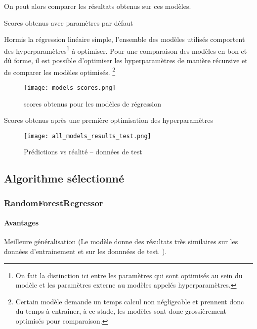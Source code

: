 On peut alors comparer les résultats obtenus sur ces modèles.
\begin{table}[H]
  
  \caption{Scores obtenus avec paramètres par défaut}
  \label{}
\end{table}

Hormis la régression linéaire simple, l'ensemble des modèles utilisés comportent
des hyperparamètres\footnote{On fait la distinction ici entre les paramètres
qui sont optimisés au sein du modèle et les paramètres externe au modèles appelés
hyperparamètres.} à optimiser.
Pour une comparaison des modèles en bon et dû forme, il est possible d'optimiser
les hyperparamètres de manière récursive et de comparer les modèles optimisés.
\footnote{Certain modèle demande un temps calcul non négligeable et prennent donc
du temps à entrainer, à ce stade, les modèles sont donc grossièrement optimisés
pour comparaison.}

\begin{figure}[H]
  \texttt{[image: models\_scores.png]}
  \caption{scores obtenus pour les modèles de régression}
  \label{}
\end{figure}

\begin{table}
  
  \caption{Scores obtenus après une première optimisation des hyperparamètres}
  \label{}

\end{table}

\begin{figure*}[p]
  \texttt{[image: all\_models\_results\_test.png]}
  \caption{Prédictions vs réalité -- données de test}
  \label{}
\end{figure*}

\subsection{Algorithme sélectionné}

\subsubsection{RandomForestRegressor}

\paragraph{Avantages} Meilleure généralisation
(Le modèle donne des résultats très similaires sur les données d'entrainement et
sur les donnnées de test. ).

